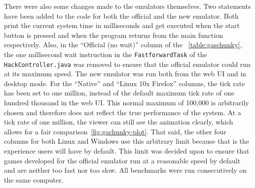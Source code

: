There were also some changes made to the emulators themselves.
Two statements have been added to the code for both the official and the new emulator.
Both print the current system time in milliseconds and get executed when the start button is pressed and when the program returns from the main function respectively.
Also, in the ``Official (no wait)'' column of the ~\cref{table:gaschunky}, the one millisecond wait instruction in the \verb+FastforwardTask+ of the \verb+HackController.java+ was removed to ensure that the official emulator could run at its maximum speed.
The new emulator was run both from the web UI and in desktop mode.
For the ``Native'' and ``Linux 10x Firefox'' columns, the tick rate has been set to one million, instead of the default maximum tick rate of one hundred thousand in the web UI.
This normal maximum of 100,000 is arbitrarily chosen and therefore does not reflect the true performance of the system.
At a tick rate of one million, the viewer can still see the animation clearly, which allows for a fair comparison~\ref{fig:gachunky-plot}.
That said, the other four columns for both Linux and Windows use this arbitrary limit because that is the experience users will have by default.
This limit was decided upon to ensure that games developed for the official emulator run at a reasonable speed by default and are neither too fast nor too slow.
All benchmarks were run consecutively on the same computer.
